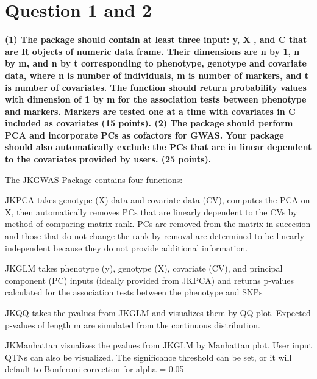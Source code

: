 \documentclass[
]{article}
\begin{document}
\hypertarget{question-1-and-2}{%
\section{Question 1 and 2}\label{question-1-and-2}}

\textbf{(1) The package should contain at least three input: y, X , and C that are R objects of numeric data frame. Their dimensions are n by 1, n by m, and n by t corresponding to phenotype, genotype and covariate data, where n is number of individuals, m is number of markers, and t is number of covariates. The function should return probability values with dimension of 1 by m for the association tests between phenotype and markers. Markers are tested one at a time with covariates in C included as covariates (15 points).
(2) The package should perform PCA and incorporate PCs as cofactors for GWAS.  Your package should also automatically exclude the PCs that are in linear dependent to the covariates provided by users. (25 points).}

The JKGWAS Package contains four functions:

\par

\textbullet JKPCA takes genotype (X) data and covariate data (CV),
computes the PCA on X, then automatically removes PCs that are linearly
dependent to the CVs by method of comparing matrix rank. PCs are removed
from the matrix in succesion and those that do not change the rank by
removal are determined to be linearly independent because they do not
provide additional information.

\par

\textbullet JKGLM takes phenotype (y), genotype (X), covariate (CV), and
principal component (PC) inputs (ideally provided from JKPCA) and
returns p-values calculated for the association tests between the
phenotype and SNPs

\par

\textbullet JKQQ takes the pvalues from JKGLM and visualizes them by QQ
plot. Expected p-values of length m are simulated from the continuous
distribution.

\par

\textbullet JKManhattan visualizes the pvalues from JKGLM by Manhattan
plot. User input QTNs can also be visualized. The significance threshold
can be set, or it will default to Bonferoni correction for alpha = 0.05
\end{document}
